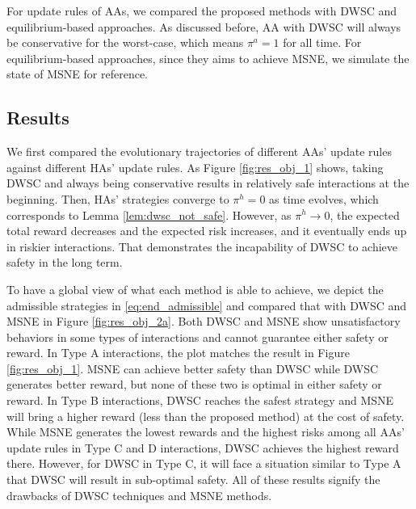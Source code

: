\documentclass[letterpaper]{article} %
\begin{document}
For update rules of AAs, we compared the proposed methods with 
DWSC and equilibrium-based approaches. As discussed before, AA with DWSC will always be conservative for the worst-case, which means $\pi^a=1$ for all time. For equilibrium-based approaches, since they aims to achieve MSNE, we simulate the state of MSNE for reference.  

\subsection{Results}
We first compared the evolutionary trajectories of different AAs' update rules against different HAs' update rules. As Figure \ref{fig:res_obj_1} shows, taking DWSC and always being conservative results in relatively safe interactions at the beginning. Then, HAs' strategies converge to $\pi^h=0$ as time evolves, which corresponds to Lemma \ref{lem:dwsc_not_safe}. However, as $\pi^h\rightarrow 0$, the expected total reward decreases and the expected risk increases, and it eventually ends up in riskier interactions. That demonstrates the incapability of DWSC to achieve safety in the long term.

To have a global view of what each method is able to achieve, we depict the admissible strategies in \eqref{eq:end_admissible} and compared that with DWSC and MSNE in Figure \ref{fig:res_obj_2a}.
Both DWSC and MSNE show unsatisfactory behaviors in some types of interactions and cannot guarantee either safety or reward.
In Type A interactions, the plot matches the result in Figure \ref{fig:res_obj_1}. MSNE can achieve better safety than DWSC while DWSC generates better reward, but none of these two is optimal in either safety or reward.
In Type B interactions, DWSC reaches the safest strategy and MSNE will bring a higher reward (less than the proposed method) at the cost of safety. 
While MSNE generates the lowest rewards and the highest risks among all AAs' update rules in Type C and D interactions, DWSC achieves the highest reward there.
However, for DWSC in Type C, it will face a situation similar to Type A that DWSC will result in sub-optimal safety.   
All of these results signify the drawbacks of DWSC techniques and MSNE methods.
\end{document}

